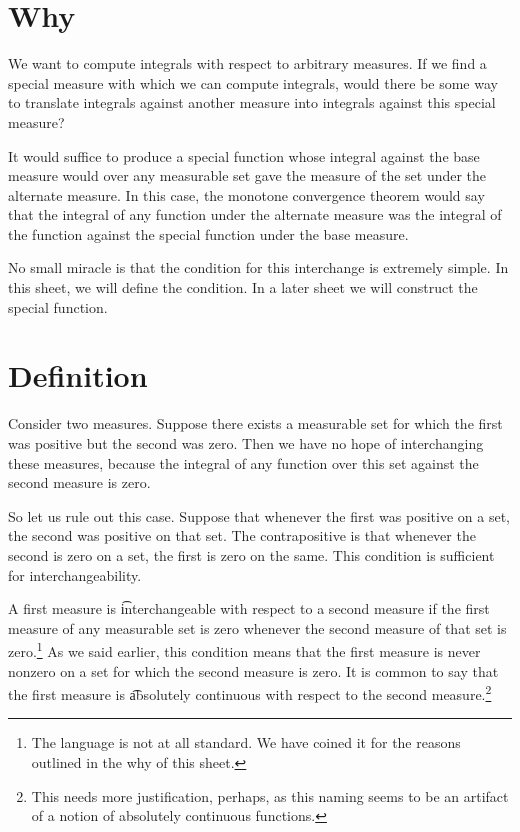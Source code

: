 

\section*{Why}

We want to compute integrals with respect to arbitrary measures.
If we find a special measure with which we can compute integrals, would there be some way to translate integrals against another measure into integrals against this special measure?

It would suffice to produce a special function
whose integral against the base measure
would over any measurable set gave
the measure of the set under the alternate
measure.
In this case, the monotone convergence
theorem would say that the integral of
any function under the alternate
measure was the integral of the function
against the special function under the
base measure.

No small miracle is that the condition
for this interchange is extremely simple.
In this sheet, we will define the
condition. In a later sheet we will
construct the special function.

\section*{Definition}

Consider two measures.
Suppose there exists a measurable set for which the first was positive but the second was zero.
Then we have no hope of interchanging these measures, because the integral of any function over this set against the second measure is zero.

So let us rule out this case.
Suppose that whenever the first was positive on a set, the second was positive on that set.
The contrapositive is that whenever the second is zero on a set, the first is zero on the same.
This condition is sufficient for interchangeability.

A first measure is \t{interchangeable} with respect to a second measure if the first measure of any measurable set is zero whenever the second measure of that set is zero.\footnote{The language  is not at all standard. We have coined it for the reasons outlined in the why of this sheet.}
As we said earlier, this condition means that the first measure is never nonzero on a set for which the second measure is zero.
It is common to say that the first measure is \t{absolutely continuous} with respect to the second measure.\footnote{This needs more justification, perhaps, as this naming seems to be an artifact of a notion of absolutely continuous functions.}


